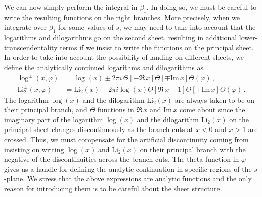 \documentclass[12pt]{article}
\numberwithin{figure}{section}
\def \Im {\mathrm{Im}}
\def \Li {\mathrm{Li}}
\begin{document}
    We can now simply perform the integral in $\beta_1$. In doing so, we must be careful to write the resulting functions on the right branches. More precisely, when we integrate over $\beta_1$ for some values of $s$, we may need to take into account that the logarithms and dilogarithms go on the second sheet, resulting in additional lower-transcendentality terms if we insist to write the functions on the principal sheet. In order to take into account the possibility of landing on different sheets, we define the analytically continued logarithms and dilogarithms as
    \begin{align} 
        \log^{\pm} (x,\varphi) &= \log (x) \pm 2 \pi i \, \Theta \left[-\Re\, x \right] 
        \Theta \left[\mp \Im\, x \right] 
        \Theta \left(\varphi \right) \,, \\
        \Li_2^{\pm} (x,\varphi) &= \Li_2(x) 
        \pm 2 \pi i \log (x) \Theta \left[\Re\, x-1 \right] 
        \Theta \left[\mp \Im\, x \right] \Theta \left(\varphi \right) \,.
    \end{align} 
    The logarithm $\log(x)$ and the dilogarithm $\Li_2(x)$ are always taken to be on their principal branch, and $\Theta$ functions in $\Re\, x$ and $\Im\, x$ come about since the imaginary part of the logarithm $\log(x)$ and the dilogarithm $\Li_2(x)$ on the principal sheet changes discontinuously as the branch cuts at $x<0$ and $x>1$ are crossed. Thus, we must compensate for the artificial discontinuity coming from insisting on writing $\log(x)$ and $\Li_2(x)$ on their principal branch with the negative of the discontinuities across the branch cuts. The theta function in $\varphi$ gives us a handle for defining the analytic continuation in specific regions of the $s$-plane. We stress that the above expressions are analytic functions and the only reason for introducing them is to be careful about the sheet structure.
    
\end{document}
